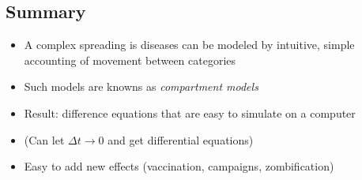 \documentclass[%
twoside,                 %
final,                   %
10pt]{article}
\begin{document}
\subsection{Summary}

\begin{itemize}
 \item A complex spreading is diseases can be modeled by intuitive, simple
   accounting of movement between categories

 \item Such models are knowns as \emph{compartment models}

 \item Result: difference equations that are easy to simulate on a computer

 \item (Can let $\Delta t\rightarrow 0$ and get differential equations)

 \item Easy to add new effects (vaccination, campaigns, zombification)
\end{itemize}

\noindent



\printindex
\end{document}
